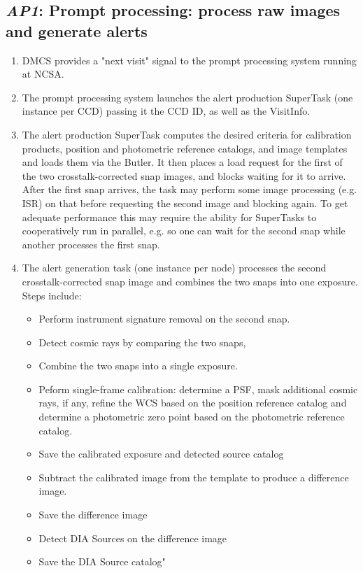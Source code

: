 \documentclass[DM,toc,lsstdraft]{lsstdoc}
\newcommand{\usecase}[3]{%
\subsection{\emph{#1}: #2}
\label{use:#1}
\begin{enumerate}[label=\alph*.]
#3
\end{enumerate}
}
\begin{document}
\usecase{AP1}{Prompt processing: process raw images and generate alerts}{%

\item
DMCS provides a "next visit" signal to the prompt processing system running at NCSA.

\item
The prompt processing system launches the alert production SuperTask (one instance per CCD) passing it the CCD ID, as well as the VisitInfo.

\item
The alert production SuperTask computes the desired criteria for calibration products, position and photometric reference catalogs, and image templates and loads them via the Butler.
It then places a load request for the first of the two crosstalk-corrected snap images, and blocks waiting for it to arrive.
After the first snap arrives, the task may perform some image processing (e.g. ISR) on that before requesting the second image and blocking again.
To get adequate performance this may require the ability for SuperTasks to cooperatively run in parallel, e.g. so one can wait for the second snap while another processes the first snap.

\item
The alert generation task (one instance per node) processes the second crosstalk-corrected snap image and combines the two snaps into one exposure.
Steps include:
\begin{itemize}
\item Perform instrument signature removal on the second snap.
\item Detect cosmic rays by comparing the two snaps,
\item Combine the two snaps into a single exposure.
\item Peform single-frame calibration: determine a PSF, mask additional cosmic rays, if any, refine the WCS based on the position reference catalog and determine a photometric zero point based on the photometric reference catalog.
\item Save the calibrated exposure and detected source catalog
\item Subtract the calibrated image from the template to produce a difference image.
\item Save the difference image
\item Detect DIA Sources on the difference image
\item Save the DIA Source catalog"
\end{itemize}

}
\end{document}

